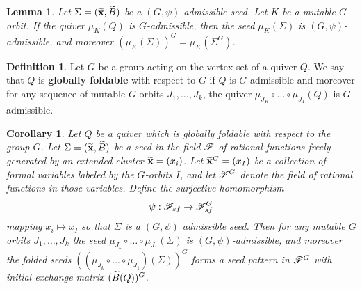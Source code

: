\documentclass[]{pcmi}
\theoremstyle{plain}
\newtheorem{Lemma}[equation]{Lemma}
\newtheorem{Corollary}[equation]{Corollary}
\theoremstyle{definition}
\newtheorem{Definition}[equation]{Definition}
\begin{document}
\begin{Lemma}
    Let $\Sigma = (\widetilde{\mathbf{x}}, \widetilde{B})$ be a $(G, \psi)$-admissible seed. Let $K$ be a mutable $G$-orbit. If the quiver $\mu_K(Q)$ is $G$-admissible, then the seed $\mu_K(\Sigma)$ is $(G, \psi)$-admissible, and moreover $(\mu_K(\Sigma))^G = \mu_K(\Sigma^G)$. 
\end{Lemma}

\begin{Definition}
    Let $G$ be a group acting on the vertex set of a quiver $Q$. We say that $Q$ is \textbf{globally foldable} with respect to $G$ if $Q$ is $G$-admissible and moreover for any sequence of mutable $G$-orbits $J_1, \ldots, J_k$, the quiver $\mu_{J_K} \circ \ldots \circ \mu_{J_1}(Q)$ is $G$-admissible. 
\end{Definition}

\begin{Corollary}
    Let $Q$ be a quiver which is globally foldable with respect to the group $G$. Let $\Sigma = (\widetilde{\mathbf{x}}, \widetilde{B})$ be a seed in the field $\mathscr{F}$ of rational functions freely generated by an extended cluster $\widetilde{\mathbf{x}} = (x_i)$. Let $\widetilde{\mathbf{x}}^G = (x_I)$ be a collection of formal variables labeled by the $G$-orbits $I$, and let $\mathscr{F}^G$ denote the field of rational functions in those variables. Define the surjective homomorphism 
    \[
        \psi : \mathscr{F}_{sf} \to \mathscr{F}_{sf}^G
    \]
    mapping $x_i \mapsto x_I$ so that $\Sigma$ is a $(G, \psi)$ admissible seed. Then for any mutable $G$ orbits $J_1, \ldots, J_k$ the seed $\mu_{J_k} \circ \ldots \circ \mu_{J_1}(\Sigma)$ is $(G, \psi)$-admissible, and moreover the folded seeds $((\mu_{J_k} \circ \ldots \circ \mu_{J_1} )(\Sigma))^G$ forms a seed pattern in $\mathscr{F}^G$ with initial exchange matrix $(\widetilde{B}(Q))^G$. 
\end{Corollary}
\appendix
\end{document}
